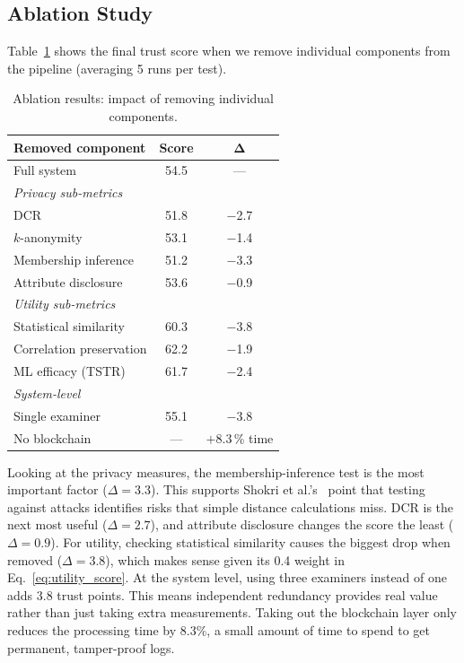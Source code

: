 \subsection{Ablation Study}

Table~\ref{tab:ablation} shows the final trust score when we remove individual components from the pipeline (averaging 5 runs per test).

\begin{table}[h]
\centering
\caption{Ablation results: impact of removing individual components.}
\label{tab:ablation}
\begin{tabular}{lcc}
\toprule
\textbf{Removed component} & \textbf{Score} & $\mathbf{\Delta}$ \\
\midrule
Full system & 54.5 & --- \\
\midrule
\multicolumn{3}{l}{\textit{Privacy sub-metrics}} \\
\quad DCR & 51.8 & $-$2.7 \\
\quad $k$-anonymity & 53.1 & $-$1.4 \\
\quad Membership inference & 51.2 & $-$3.3 \\
\quad Attribute disclosure & 53.6 & $-$0.9 \\
\midrule
\multicolumn{3}{l}{\textit{Utility sub-metrics}} \\
\quad Statistical similarity & 60.3 & $-$3.8 \\
\quad Correlation preservation & 62.2 & $-$1.9 \\
\quad ML efficacy (TSTR) & 61.7 & $-$2.4 \\
\midrule
\multicolumn{3}{l}{\textit{System-level}} \\
\quad Single examiner & 55.1 & $-$3.8 \\
\quad No blockchain & --- & $+$8.3\,\% time \\
\bottomrule
\end{tabular}
\end{table}

Looking at the privacy measures, the membership-inference test is the most important factor ($\Delta{=}3.3$). This supports Shokri et al.'s~\cite{shokri2017membership} point that testing against attacks identifies risks that simple distance calculations miss. DCR is the next most useful ($\Delta{=}2.7$), and attribute disclosure changes the score the least ($\Delta{=}0.9$). For utility, checking statistical similarity causes the biggest drop when removed ($\Delta{=}3.8$), which makes sense given its 0.4 weight in Eq.~\ref{eq:utility_score}. At the system level, using three examiners instead of one adds 3.8 trust points. This means independent redundancy provides real value rather than just taking extra measurements. Taking out the blockchain layer only reduces the processing time by 8.3\%, a small amount of time to spend to get permanent, tamper-proof logs.

